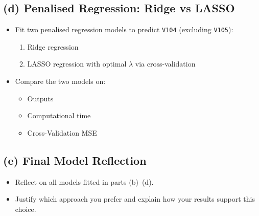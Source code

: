 \subsection*{(d) Penalised Regression: Ridge vs LASSO}
\begin{itemize}
  \item Fit two penalised regression models to predict \texttt{V104} (excluding \texttt{V105}):
  \begin{enumerate}
    \item Ridge regression
    \item LASSO regression with optimal $\lambda$ via cross-validation
  \end{enumerate}
  \item Compare the two models on:
  \begin{itemize}
    \item Outputs
    \item Computational time
    \item Cross-Validation MSE
  \end{itemize}
\end{itemize}

\subsection*{(e) Final Model Reflection}
\begin{itemize}
  \item Reflect on all models fitted in parts (b)--(d).
  \item Justify which approach you prefer and explain how your results support this choice.
\end{itemize}
